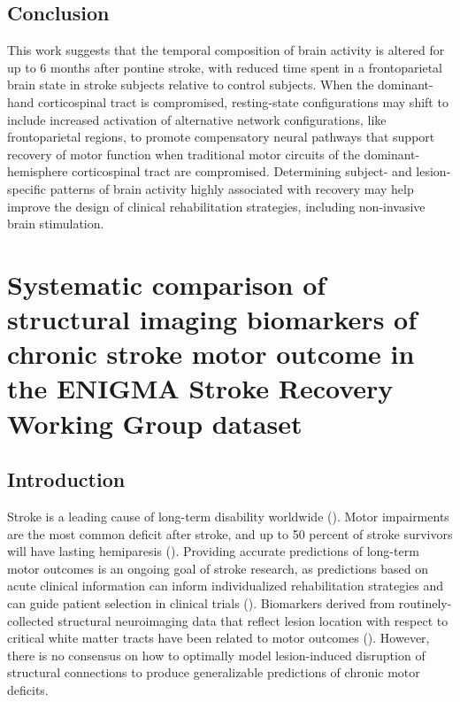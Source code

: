 \documentclass[phd,tocprelim]{cornell}
\begin{document}
\section{Conclusion}
    This work suggests that the temporal composition of brain activity is altered for up to 6 months after pontine stroke, with reduced time spent in a frontoparietal brain state in stroke subjects relative to control subjects. When the dominant-hand corticospinal tract is compromised, resting-state configurations may shift to include increased activation of alternative network configurations, like frontoparietal regions, to promote compensatory neural pathways that support recovery of motor function when traditional motor circuits of the dominant-hemisphere corticospinal tract are compromised. Determining subject- and  lesion-specific patterns of brain activity highly associated with recovery may help improve the design of clinical rehabilitation strategies, including non-invasive brain stimulation.


\label{chap:3}
\chapter{Systematic comparison of structural imaging biomarkers of chronic stroke motor outcome in the ENIGMA Stroke Recovery Working Group dataset}
\section{Introduction}
Stroke is a leading cause of long-term disability worldwide (\cite{Katan2018-qn}). Motor impairments are the most common deficit after stroke, and up to 50 percent of stroke survivors will have lasting hemiparesis (\cite{Kelly-Hayes2003-sp}). Providing accurate predictions of long-term motor outcomes is an ongoing goal of stroke research, as predictions based on acute clinical information can inform individualized rehabilitation strategies and can guide patient selection in clinical trials (\cite{Bonkhoff2022-op, Boyd2017-gs}). Biomarkers derived from routinely-collected structural neuroimaging data that reflect lesion location with respect to critical white matter tracts have been related to motor outcomes (\cite{Tozlu2020-qa, Kuceyeski2016-vj, Griffis2019-cy, Salvalaggio2020-pe, Bowren2022-rs}). However, there is no consensus on how to optimally model lesion-induced disruption of structural connections to produce generalizable predictions of chronic motor deficits. 
\end{document}
